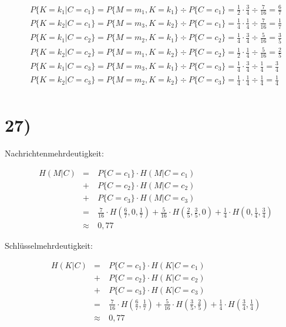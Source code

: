   \begin{align*}
    & P\{K = k_1 | C = c_1\} = P\{M = m_1, K = k_1\} \div P\{C = c_1\} = \frac{1}{2} \cdot \frac{3}{4} \div \frac{7}{16} = \frac{6}{7}\\
    & P\{K = k_2 | C = c_1\} = P\{M = m_3, K = k_2\} \div P\{C = c_1\} = \frac{1}{4} \cdot \frac{1}{4} \div \frac{7}{16} = \frac{1}{7}\\
    & P\{K = k_1 | C = c_2\} = P\{M = m_2, K = k_1\} \div P\{C = c_2\} = \frac{1}{4} \cdot \frac{3}{4} \div \frac{5}{16} = \frac{3}{5}\\
    & P\{K = k_2 | C = c_2\} = P\{M = m_1, K = k_2\} \div P\{C = c_2\} = \frac{1}{2} \cdot \frac{1}{4} \div \frac{5}{16} = \frac{2}{5}\\
    & P\{K = k_1 | C = c_3\} = P\{M = m_3, K = k_1\} \div P\{C = c_3\} = \frac{1}{4} \cdot \frac{3}{4} \div \frac{1}{4} = \frac{3}{4}\\
    & P\{K = k_2 | C = c_3\} = P\{M = m_2, K = k_2\} \div P\{C = c_3\} = \frac{1}{4} \cdot \frac{1}{4} \div \frac{1}{4} = \frac{1}{4}\\
  \end{align*}

  \section*{27)}

  Nachrichtenmehrdeutigkeit:

  \begin{align*}
    & H(M | C) & = &\ P\{C = c_1\} \cdot H(M | C = c_1)\\
    &          & + &\ P\{C = c_2\} \cdot H(M | C = c_2)\\
    &          & + &\ P\{C = c_3\} \cdot H(M | C = c_3)\\
    &          & = &\ \frac{7}{16} \cdot H(\frac{6}{7}, 0,  \frac{1}{7}) + \frac{5}{16} \cdot H(\frac{2}{5}, \frac{3}{5}, 0) + \frac{1}{4} \cdot H(0, \frac{1}{4}, \frac{3}{4})\\
    &          & \approx &\ 0,77
  \end{align*}

  Schlüsselmehrdeutigkeit:

  \begin{align*}
    & H(K | C) & = &\ P\{C = c_1\} \cdot H(K | C = c_1)\\
    &          & + &\ P\{C = c_2\} \cdot H(K | C = c_2)\\
    &          & + &\ P\{C = c_3\} \cdot H(K | C = c_3)\\
    &          & = &\ \frac{7}{16} \cdot H(\frac{6}{7}, \frac{1}{7}) + \frac{5}{16} \cdot H(\frac{3}{5}, \frac{2}{5}) + \frac{1}{4} \cdot H(\frac{3}{4}, \frac{1}{4})\\
    &          & \approx &\ 0,77
  \end{align*}

